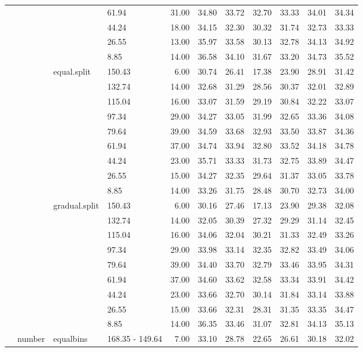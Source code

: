 \begin{longtable}{llllrrrrrrr}
   &  &  & 61.94 & 31.00 & 34.80 & 33.72 & 32.70 & 33.33 & 34.01 & 34.34 \\ 
   &  &  & 44.24 & 18.00 & 34.15 & 32.30 & 30.32 & 31.74 & 32.73 & 33.33 \\ 
   &  &  & 26.55 & 13.00 & 35.97 & 33.58 & 30.13 & 32.78 & 34.13 & 34.92 \\ 
   &  &  & 8.85 & 14.00 & 36.58 & 34.10 & 31.67 & 33.20 & 34.73 & 35.52 \\ 
   &  & equal.split & 150.43 & 6.00 & 30.74 & 26.41 & 17.38 & 23.90 & 28.91 & 31.42 \\ 
   &  &  & 132.74 & 14.00 & 32.68 & 31.29 & 28.56 & 30.37 & 32.01 & 32.89 \\ 
   &  &  & 115.04 & 16.00 & 33.07 & 31.59 & 29.19 & 30.84 & 32.22 & 33.07 \\ 
   &  &  & 97.34 & 29.00 & 34.27 & 33.05 & 31.99 & 32.65 & 33.36 & 34.08 \\ 
   &  &  & 79.64 & 39.00 & 34.59 & 33.68 & 32.93 & 33.50 & 33.87 & 34.36 \\ 
   &  &  & 61.94 & 37.00 & 34.74 & 33.94 & 32.80 & 33.52 & 34.18 & 34.78 \\ 
   &  &  & 44.24 & 23.00 & 35.71 & 33.33 & 31.73 & 32.75 & 33.89 & 34.47 \\ 
   &  &  & 26.55 & 15.00 & 34.27 & 32.35 & 29.64 & 31.37 & 33.05 & 33.78 \\ 
   &  &  & 8.85 & 14.00 & 33.26 & 31.75 & 28.48 & 30.70 & 32.73 & 34.00 \\ 
   &  & gradual.split & 150.43 & 6.00 & 30.16 & 27.46 & 17.13 & 23.90 & 29.38 & 32.08 \\ 
   &  &  & 132.74 & 14.00 & 32.05 & 30.39 & 27.32 & 29.29 & 31.14 & 32.45 \\ 
   &  &  & 115.04 & 16.00 & 34.06 & 32.04 & 30.21 & 31.33 & 32.49 & 33.26 \\ 
   &  &  & 97.34 & 29.00 & 33.98 & 33.14 & 32.35 & 32.82 & 33.49 & 34.06 \\ 
   &  &  & 79.64 & 39.00 & 34.40 & 33.70 & 32.79 & 33.46 & 33.95 & 34.31 \\ 
   &  &  & 61.94 & 37.00 & 34.60 & 33.62 & 32.58 & 33.34 & 33.91 & 34.42 \\ 
   &  &  & 44.24 & 23.00 & 33.66 & 32.70 & 30.14 & 31.84 & 33.14 & 33.88 \\ 
   &  &  & 26.55 & 15.00 & 33.66 & 32.31 & 28.31 & 31.35 & 33.35 & 34.47 \\ 
   &  &  & 8.85 & 14.00 & 36.35 & 33.46 & 31.07 & 32.81 & 34.13 & 35.13 \\ 
   & number & equalbins & 168.35 - 149.64 & 7.00 & 33.10 & 28.78 & 22.65 & 26.61 & 30.18 & 32.02 \\ 

\end{longtable}
